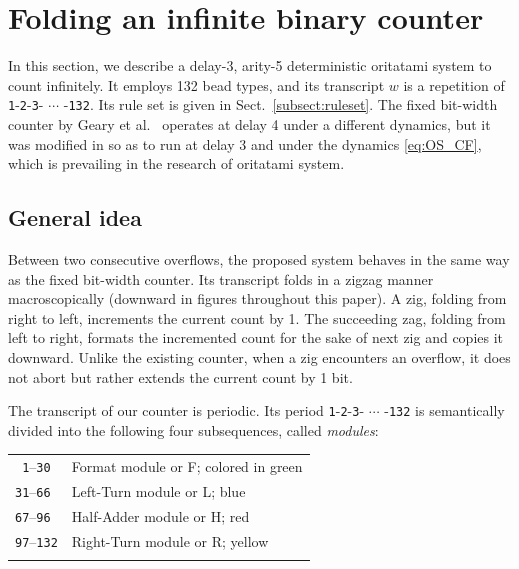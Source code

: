 \documentclass[twocolumn]{svjour3}
\begin{document}
	\section{Folding an infinite binary counter}
	\label{sect:detail}

In this section, we describe a delay-3, arity-5 deterministic oritatami system to count infinitely. 
It employs 132 bead types, and its transcript $w$ is a repetition of \texttt{1}-\texttt{2}-\texttt{3}- $\cdots$ -\texttt{132}. 
Its rule set is given in Sect.~\ref{subsect:ruleset}. 
The fixed bit-width counter by Geary et al.~\cite{GeMeScSe2019} operates at delay 4 under a different dynamics, but it was modified in \cite{MasudaSekiUbukata2018} so as to run at delay 3 and under the dynamics \eqref{eq:OS_CF}, which is prevailing in the research of oritatami system. 

\subsection{General idea}
Between two consecutive overflows, the proposed system behaves in the same way as the fixed bit-width counter.
Its transcript folds in a zigzag manner macroscopically (downward in figures throughout this paper).
A zig, folding from right to left, increments the current count by 1.
The succeeding zag, folding from left to right, formats the incremented count for the sake of next zig and copies it downward.
Unlike the existing counter, when a zig encounters an overflow, it does not abort but rather extends the current count by 1 bit.



The transcript of our counter is periodic.
Its period \texttt{1}-\texttt{2}-\texttt{3}- $\cdots$ -\texttt{132} is semantically divided into the following four subsequences, called \textit{modules}: \\
\begin{tabular}{ll}
\\
\texttt{ 1}--\texttt{30} & Format module or F; colored in green \\
\texttt{31}--\texttt{66} & Left-Turn module or L; blue \\
\texttt{67}--\texttt{96} & Half-Adder module or H; red \\
\texttt{97}--\texttt{132} & Right-Turn module  or R; yellow \\
\\
\end{tabular}
\end{document}
